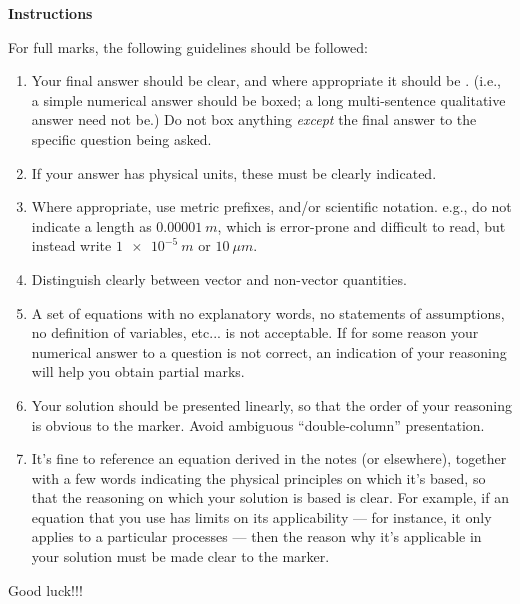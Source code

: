 \documentclass[12pt,geometry,width=8in]{article}
\begin{document}
\newpage

{\bf Instructions}

For full marks, the following guidelines should be followed:
\begin{enumerate}[(1)]
\item Your final answer should be clear, and where appropriate it should be .  (i.e., a simple numerical answer should be boxed; a long multi-sentence qualitative answer need not be.)  Do not box anything {\em except} the final answer to the specific question being asked.
\item If your answer has physical units, these must be clearly indicated.
\item Where appropriate, use metric prefixes, and/or scientific notation.
e.g., do not indicate a length as $\SI{0.00001}{m}$, which is error-prone and difficult to read, but instead write $\SI{1e-5}{m}$ or $\SI{10}{\mu m}$.
\item Distinguish clearly between vector and non-vector quantities.
\item A set of equations with no explanatory words, no statements of assumptions, no definition of variables, etc... is not acceptable.  If for some reason your numerical answer to a question is not correct, an indication of your reasoning will help you obtain partial marks.
\item Your solution should be presented linearly, so that the order of your reasoning is obvious to the marker.  Avoid ambiguous ``double-column'' presentation.
\item It's fine to reference an equation derived in the notes (or elsewhere), together with a few words indicating the physical principles on which it's based, so that the reasoning on which your solution is based is clear. For example, if an equation that you use has limits on its applicability --- for instance, it only applies to a particular processes --- then the reason why it's applicable in your solution must be made clear to the marker.
\end{enumerate}

\begin{center}
Good luck!!!
\end{center}
\end{document}

